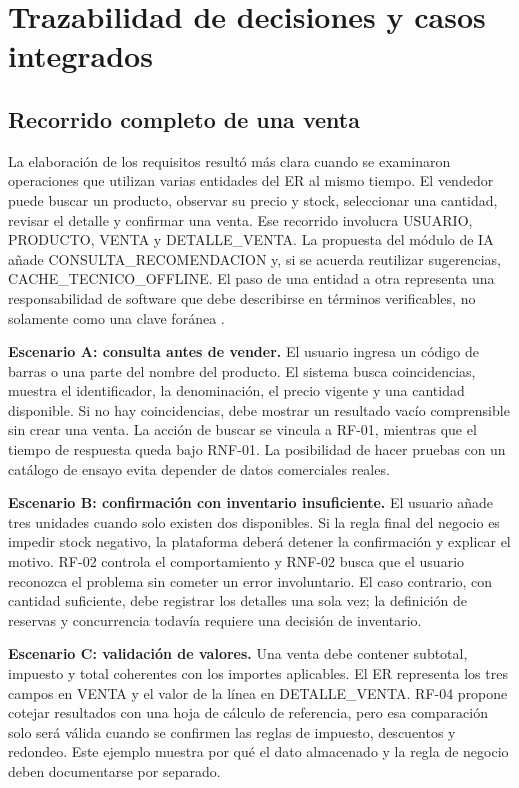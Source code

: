 \section{Trazabilidad de decisiones y casos integrados}
\subsection{Recorrido completo de una venta}
La elaboración de los requisitos resultó más clara cuando se examinaron operaciones que utilizan varias entidades del ER al mismo tiempo. El vendedor puede buscar un producto, observar su precio y stock, seleccionar una cantidad, revisar el detalle y confirmar una venta. Ese recorrido involucra USUARIO, PRODUCTO, VENTA y DETALLE\_VENTA. La propuesta del módulo de IA añade CONSULTA\_RECOMENDACION y, si se acuerda reutilizar sugerencias, CACHE\_TECNICO\_OFFLINE. El paso de una entidad a otra representa una responsabilidad de software que debe describirse en términos verificables, no solamente como una clave foránea \cite{erPFC2026,iso29148}.

\textbf{Escenario A: consulta antes de vender.} El usuario ingresa un código de barras o una parte del nombre del producto. El sistema busca coincidencias, muestra el identificador, la denominación, el precio vigente y una cantidad disponible. Si no hay coincidencias, debe mostrar un resultado vacío comprensible sin crear una venta. La acción de buscar se vincula a RF-01, mientras que el tiempo de respuesta queda bajo RNF-01. La posibilidad de hacer pruebas con un catálogo de ensayo evita depender de datos comerciales reales.

\textbf{Escenario B: confirmación con inventario insuficiente.} El usuario añade tres unidades cuando solo existen dos disponibles. Si la regla final del negocio es impedir stock negativo, la plataforma deberá detener la confirmación y explicar el motivo. RF-02 controla el comportamiento y RNF-02 busca que el usuario reconozca el problema sin cometer un error involuntario. El caso contrario, con cantidad suficiente, debe registrar los detalles una sola vez; la definición de reservas y concurrencia todavía requiere una decisión de inventario.

\textbf{Escenario C: validación de valores.} Una venta debe contener subtotal, impuesto y total coherentes con los importes aplicables. El ER representa los tres campos en VENTA y el valor de la línea en DETALLE\_VENTA. RF-04 propone cotejar resultados con una hoja de cálculo de referencia, pero esa comparación solo será válida cuando se confirmen las reglas de impuesto, descuentos y redondeo. Este ejemplo muestra por qué el dato almacenado y la regla de negocio deben documentarse por separado.

